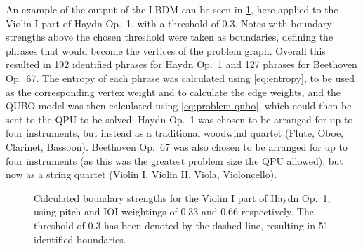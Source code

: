 \documentclass[12pt]{article}
\theoremstyle{definition}
\begin{document}
An example of the output of the LBDM can be seen in \cref{fig:phrase-extraction}, here applied to the Violin I part of Haydn Op.\ 1, with a threshold of \num{0.3}. Notes with boundary strengths above the chosen threshold were taken as boundaries, defining the phrases that would become the vertices of the problem graph. Overall this resulted in \num{192} identified phrases for Haydn Op.\ 1 and \num{127} phrases for Beethoven Op.\ 67. The entropy of each phrase was calculated using \cref{eq:entropy}, to be used as the corresponding vertex weight and to calculate the edge weights, and the QUBO model was then calculated using \cref{eq:problem-qubo}, which could then be sent to the QPU to be solved. Haydn Op.\ 1 was chosen to be arranged for up to four instruments, but instead as a traditional woodwind quartet (Flute, Oboe, Clarinet, Bassoon). Beethoven Op.\ 67 was also chosen to be arranged for up to four instruments (as this was the greatest problem size the QPU allowed), but now as a string quartet (Violin I, Violin II, Viola, Violoncello).

\begin{figure}[h]
    \small
    
    \caption{Calculated boundary strengths for the Violin I part of Haydn Op.\ 1, using pitch and IOI weightings of \num{0.33} and \num{0.66} respectively. The threshold of \num{0.3} has been denoted by the dashed line, resulting in \num{51} identified boundaries.}
    \label{fig:phrase-extraction}
\end{figure}
\end{document}
